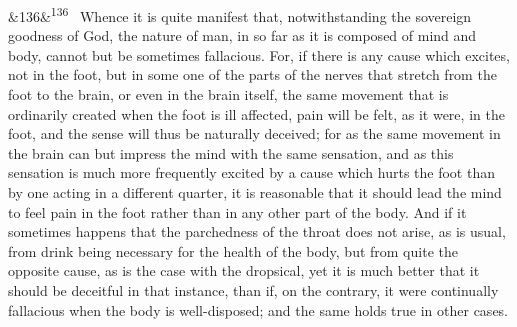 \documentclass[12pt]{article}
\newcommand{\para}[1][]{\par\noindent\ifx&#1&\else\textsuperscript{\footnotesize #1}~\fi}
\begin{document}
\para[136] Whence it is quite manifest that, notwithstanding the sovereign goodness of God, the nature of man, in so far as it is composed of mind and body, cannot but be sometimes fallacious. For, if there is any cause which excites, not in the foot, but in some one of the parts of the nerves that stretch from the foot to the brain, or even in the brain itself, the same movement that is ordinarily created when the foot is ill affected, pain will be felt, as it were, in the foot, and the sense will thus be naturally deceived; for as the same movement in the brain can but impress the mind with the same sensation, and as this sensation is much more frequently excited by a cause which hurts the foot than by one acting in a different quarter, it is reasonable that it should lead the mind to feel pain in the foot rather than in any other part of the body. And if it sometimes happens that the parchedness of the throat does not arise, as is usual, from drink being necessary for the health of the body, but from quite the opposite cause, as is the case with the dropsical, yet it is much better that it should be deceitful in that instance, than if, on the contrary, it were continually fallacious when the body is well-disposed; and the same holds true in other cases.
\end{document}

